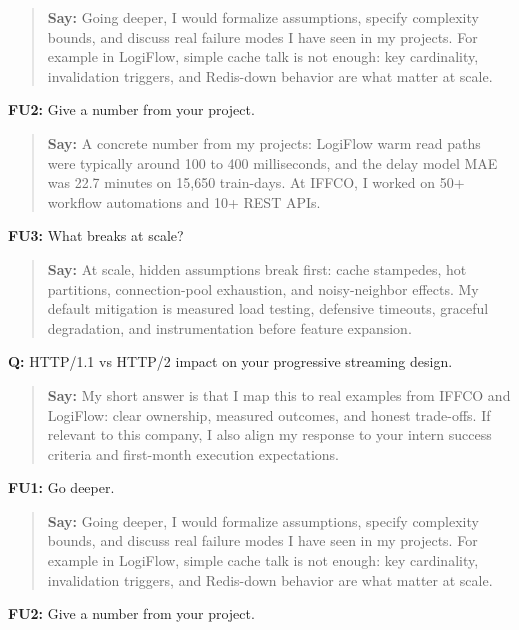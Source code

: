 \documentclass[9pt,a4paper]{article}
\begin{document}
\begin{quote}\small\textbf{Say:} Going deeper, I would formalize assumptions, specify complexity bounds, and discuss real failure modes I have seen in my projects. For example in LogiFlow, simple cache talk is not enough: key cardinality, invalidation triggers, and Redis-down behavior are what matter at scale.\end{quote}
\vspace{2mm}
\textbf{FU2:} Give a number from your project.

\begin{quote}\small\textbf{Say:} A concrete number from my projects: LogiFlow warm read paths were typically around 100 to 400 milliseconds, and the delay model MAE was 22.7 minutes on 15,650 train-days. At IFFCO, I worked on 50+ workflow automations and 10+ REST APIs.\end{quote}
\vspace{2mm}
\textbf{FU3:} What breaks at scale?

\begin{quote}\small\textbf{Say:} At scale, hidden assumptions break first: cache stampedes, hot partitions, connection-pool exhaustion, and noisy-neighbor effects. My default mitigation is measured load testing, defensive timeouts, graceful degradation, and instrumentation before feature expansion.\end{quote}
\vspace{2mm}
\textbf{Q:} HTTP/1.1 vs HTTP/2 impact on your progressive streaming design.

\begin{quote}\small\textbf{Say:} My short answer is that I map this to real examples from IFFCO and LogiFlow: clear ownership, measured outcomes, and honest trade-offs. If relevant to this company, I also align my response to your intern success criteria and first-month execution expectations.\end{quote}
\vspace{2mm}
\textbf{FU1:} Go deeper.

\begin{quote}\small\textbf{Say:} Going deeper, I would formalize assumptions, specify complexity bounds, and discuss real failure modes I have seen in my projects. For example in LogiFlow, simple cache talk is not enough: key cardinality, invalidation triggers, and Redis-down behavior are what matter at scale.\end{quote}
\vspace{2mm}
\textbf{FU2:} Give a number from your project.
\end{document}
